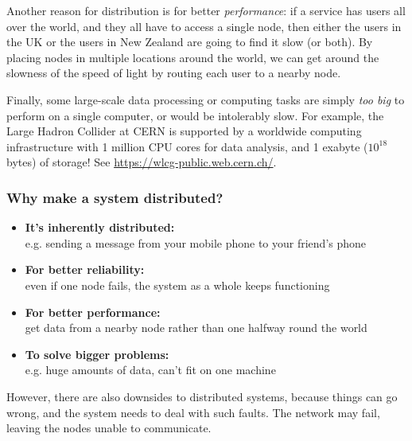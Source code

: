 Another reason for distribution is for better \emph{performance}: if a service has users all over the world, and they all have to access a single node, then either the users in the UK or the users in New Zealand are going to find it slow (or both).
By placing nodes in multiple locations around the world, we can get around the slowness of the speed of light by routing each user to a nearby node.

Finally, some large-scale data processing or computing tasks are simply \emph{too big} to perform on a single computer, or would be intolerably slow.
For example, the Large Hadron Collider at CERN is supported by a worldwide computing infrastructure with 1 million CPU cores for data analysis, and 1 exabyte ($10^{18}$ bytes) of storage! See \url{https://wlcg-public.web.cern.ch/}.

\begin{frame}
    \label{s:why-distribute}
    \frametitle{Why make a system distributed?}
    \begin{itemize}\pause
        \item \textbf{It's inherently distributed:}\\e.g. sending a message from your mobile phone to your friend's phone\pause
        \item \textbf{For better reliability:}\\even if one node fails, the system as a whole keeps functioning\pause
        \item \textbf{For better performance:}\\get data from a nearby node rather than one halfway round the world\pause
        \item \textbf{To solve bigger problems:}\\e.g. huge amounts of data, can't fit on one machine
    \end{itemize}
\end{frame}
\label{l:why-distribute}

However, there are also downsides to distributed systems, because things can go wrong, and the system needs to deal with such faults.
The network may fail, leaving the nodes unable to communicate.

